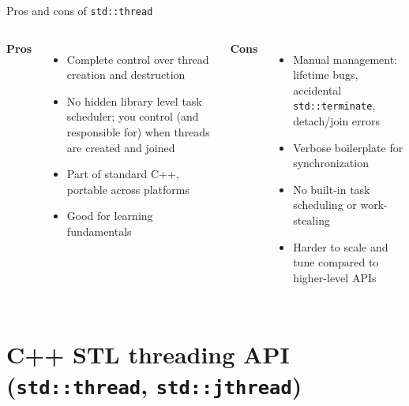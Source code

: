 \documentclass{beamer}
\begin{document}
\begin{frame}{Pros and cons of \texttt{std::thread}}
  \begin{columns}
      \textbf{Pros}
      \begin{itemize}
        \item Complete control over thread creation and destruction
        \item No hidden library level task scheduler; you control (and responsible for) when threads are created and joined
        \item Part of standard C++, portable across platforms
        \item Good for learning fundamentals
      \end{itemize}
      \textbf{Cons}
      \begin{itemize}
        \item Manual management: lifetime bugs, accidental \texttt{std::terminate}, detach/join errors
        \item Verbose boilerplate for synchronization
        \item No built-in task scheduling or work-stealing
        \item Harder to scale and tune compared to higher-level APIs
      \end{itemize}
  \end{columns}
\end{frame}

\section{C++ STL threading API (\texttt{std::thread}, \texttt{std::jthread})}
\end{document}
